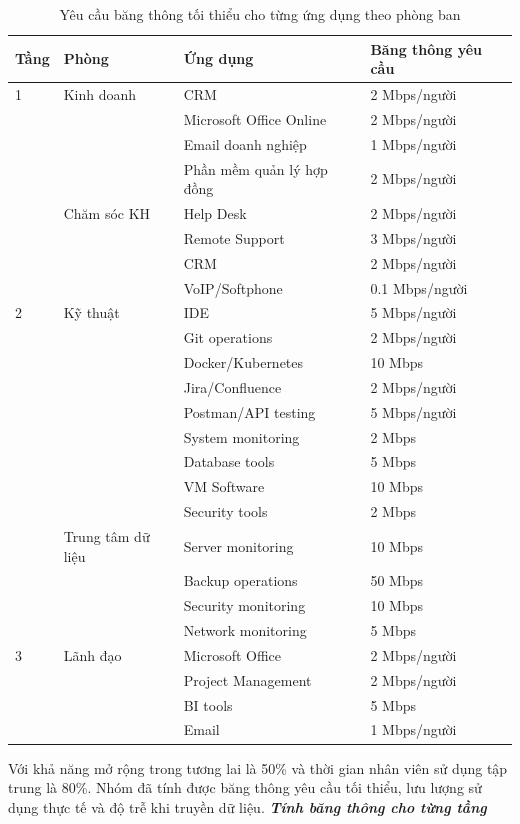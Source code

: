\begin{table}[h]
    \centering
    \begin{tabular}{|l|l|l|l|}
        \hline
        \textbf{Tầng} & \textbf{Phòng} & \textbf{Ứng dụng} & \textbf{Băng thông yêu cầu} \\
        \hline
        1 & Kinh doanh & CRM & 2 Mbps/người \\
        & & Microsoft Office Online & 2 Mbps/người \\
        & & Email doanh nghiệp & 1 Mbps/người \\
        & & Phần mềm quản lý hợp đồng & 2 Mbps/người \\
        \cline{2-4}
        & Chăm sóc KH & Help Desk & 2 Mbps/người \\
        & & Remote Support & 3 Mbps/người \\
        & & CRM & 2 Mbps/người \\
        & & VoIP/Softphone & 0.1 Mbps/người \\
        \hline
        2 & Kỹ thuật & IDE & 5 Mbps/người \\
        & & Git operations & 2 Mbps/người \\
        & & Docker/Kubernetes & 10 Mbps \\
        & & Jira/Confluence & 2 Mbps/người \\
        & & Postman/API testing & 5 Mbps/người \\
        & & System monitoring & 2 Mbps \\
        & & Database tools & 5 Mbps \\
        & & VM Software & 10 Mbps \\
        & & Security tools & 2 Mbps \\
        \cline{2-4}
        & Trung tâm dữ liệu & Server monitoring & 10 Mbps \\
        & & Backup operations & 50 Mbps \\
        & & Security monitoring & 10 Mbps \\
        & & Network monitoring & 5 Mbps \\
        \hline
        3 & Lãnh đạo & Microsoft Office & 2 Mbps/người \\
        & & Project Management & 2 Mbps/người \\
        & & BI tools & 5 Mbps \\
        & & Email & 1 Mbps/người \\
        \hline
    \end{tabular}
    \caption{Yêu cầu băng thông tối thiểu cho từng ứng dụng theo phòng ban}
    \label{tab:bandwidth}
\end{table}
Với khả năng mở rộng trong tương lai là 50\% và thời gian nhân viên sử dụng tập trung là 80\%. Nhóm đã tính được băng thông yêu cầu tối thiểu, lưu lượng sử dụng thực tế và độ trễ khi truyền dữ liệu.
\newpage
\textit{\textbf{Tính băng thông cho từng tầng}}

